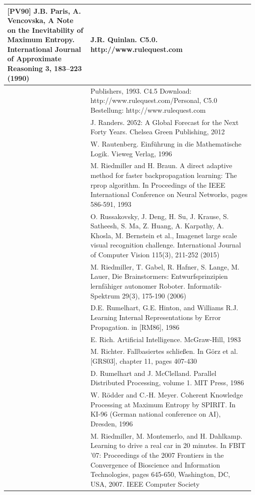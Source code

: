 \documentclass[10pt]{book}
\begin{document}
\begin{tabular}{|l|l|}
[PV90] J.B. Paris, A. Vencovska, A Note on the Inevitability of Maximum Entropy. International Journal of Approximate Reasoning 3, 183–223 (1990)
 & J.R. Quinlan. C5.0. http://www.rulequest.com \\
\hline [Qui93] & Publishers, 1993. C4.5 Download: http://www.rulequest.com/Personal, C5.0 Bestellung: http://www.rulequest.com \\
\hline [Ran12] & J. Randers. 2052: A Global Forecast for the Next Forty Years. Chelsea Green Publishing, 2012 \\
\hline [\cite{rautenberg1996logik}] & W. Rautenberg. Einführung in die Mathematische Logik. Vieweg Verlag, 1996 \\
\hline [RB93] & M. Riedmiller and H. Braun. A direct adaptive method for faster backpropagation learning: The rprop algorithm. In Proceedings of the IEEE International Conference on Neural Networks, pages 586-591, 1993 \\
\hline [RDS+15] & O. Russakovsky, J. Deng, H. Su, J. Krause, S. Satheesh, S. Ma, Z. Huang, A. Karpathy, A. Khosla, M. Bernstein et al., Imagenet large scale visual recognition challenge. International Journal of Computer Vision 115(3), 211-252 (2015) \\
\hline [RGH+06] & M. Riedmiller, T. Gabel, R. Hafner, S. Lange, M. Lauer, Die Brainstormers: Entwurfsprinzipien lernfähiger autonomer Roboter. Informatik-Spektrum 29(3), 175-190 (2006) \\
\hline [RHR86] & D.E. Rumelhart, G.E. Hinton, and Williams R.J. Learning Internal Representations by Error Propagation. in [RM86], 1986 \\
\hline [Ric83] & E. Rich. Artificial Intelligence. McGraw-Hill, 1983 \\
\hline [\cite{richter2003fallbasiertes}] & M. Richter. Fallbasiertes schließen. In Görz et al. [GRS03], chapter 11, pages 407-430 \\
\hline [RM86] & D. Rumelhart and J. McClelland. Parallel Distributed Processing, volume 1. MIT Press, 1986 \\
\hline [RM96] & W. Rödder and C.-H. Meyer. Coherent Knowledge Processing at Maximum Entropy by SPIRIT. In KI-96 (German national conference on AI), Dresden, 1996 \\
\hline [RMD07] & M. Riedmiller, M. Montemerlo, and H. Dahlkamp. Learning to drive a real car in 20 minutes. In FBIT '07: Proceedings of the 2007 Frontiers in the Convergence of Bioscience and Information Technologies, pages 645-650, Washington, DC, USA, 2007. IEEE Computer Society \\

\end{tabular}
\end{document}

